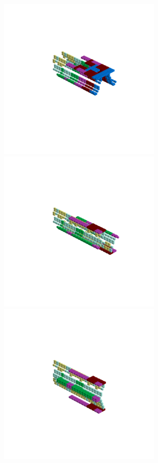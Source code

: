 \begin{minipage}[b]{0.50\linewidth}                                       
  \begin{figure}[H]
      \centering
        \vspace*{-1cm}
        \hspace*{-2cm}
        \includegraphics[width=8cm]{src/symmetries/pattern13_1-45.png}%
        \hspace*{-4cm}
        \includegraphics[width=8cm]{src/symmetries/pattern13_2-45.png}\\
        \vspace*{-5cm}
        \hspace*{-1cm}
        \includegraphics[width=8cm]{src/symmetries/pattern13_3-45.png}\\

\end{figure}
\end{minipage}
